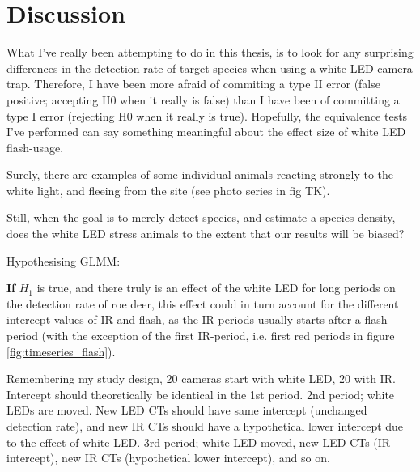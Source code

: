 \chapter{Discussion}

What I've really been attempting to do in this thesis, is to look for any surprising differences in the detection rate of target species when using a white LED camera trap. Therefore, I have been more afraid of commiting a type II error (false positive; accepting H0 when it really is false) than I have been of committing a type I error (rejecting H0 when it really is true).
Hopefully, the equivalence tests I've performed can say something meaningful about the effect size of white LED flash-usage.

Surely, there are examples of some individual animals reacting strongly to the white light, and fleeing from the site (see photo series in fig TK).

Still, when the goal is to merely detect species, and estimate a species density, does the white LED stress animals to the extent that our results will be biased? %















Hypothesising GLMM:

\textbf{If} $H_1$ is true, and there truly is an effect of the white LED for long periods on the detection rate of roe deer, this effect could in turn account for the different intercept values of IR and flash, as the IR periods usually starts after a flash period (with the exception of the first IR-period, i.e. first red periods in figure \vref{fig:timeseries_flash}).

Remembering my study design, 20 cameras start with white LED, 20 with IR.
Intercept should theoretically be identical in the 1st period.
2nd period; white LEDs are moved. New LED CTs should have same intercept (unchanged detection rate), and new IR CTs should have a hypothetical lower intercept due to the effect of white LED.
3rd period; white LED moved, new LED CTs (IR intercept), new IR CTs (hypothetical lower intercept), and so on.

